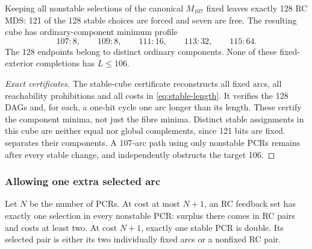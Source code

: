 \begin{proposition}
\label{prop:stable-fibre}
Keeping all nonstable selections of the canonical $M_{107}$ fixed
leaves exactly 128 RC MDS: 121 of the 128 stable choices are forced
and seven are free. The resulting cube has ordinary-component
minimum profile
\[
 107:8,\qquad109:8,\qquad111:16,\qquad113:32,\qquad115:64.
\]
The 128 endpoints belong to distinct ordinary components. None of
these fixed-exterior completions has $L\le106$.
\end{proposition}
\begin{proof}[Exact certificates]
The stable-cube certificate reconstructs all fixed arcs, all
reachability prohibitions and all costs in \eqref{eq:stable-length}.
It verifies the 128 DAGs and, for each, a one-hit cycle one arc
longer than its length. These certify the component minima, not
just the fibre minima. Distinct stable assignments in this cube
are neither equal nor global complements, since 121 bits are
fixed.  separates their components.
A 107-arc path using only nonstable PCRs remains after every stable
change, and independently obstructs the target 106.
\end{proof}

\subsubsection{Allowing one extra selected arc}
Let $N$ be the number of PCRs. At cost at most $N+1$, an RC
feedback set has exactly one selection in every nonstable PCR:
surplus there comes in RC pairs and costs at least two. At cost
$N+1$, exactly one stable PCR is double. Its selected pair is
either its two individually fixed arcs or a nonfixed RC pair.

